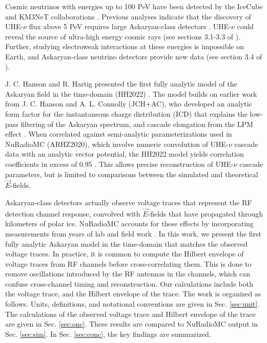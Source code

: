 \documentclass[amsmath,amssymb,aps,prd,10pt,twocolumn,showkeys]{revtex4}
\begin{document}
Cosmic neutrinos with energies up to 100 PeV have been detected by the IceCube and KM3NeT collaborations \cite{10.1126/science.1242856,aartsen2013first-bff,collaboration2016observation-03b,collaboration2018neutrino-2a0,collaboration2021detection-6fa,collaboration2022evidence-a08,collaboration2023observation-08b,collaboration2025observation-22f}. Previous analyses indicate that the discovery of UHE-$\nu$ flux above 5 PeV requires large Askaryan-class detectors \cite{10.1103/physrevd.98.062003}.  UHE-$\nu$ could reveal the source of ultra-high energy cosmic rays (see sections 3.1-3.3 of \cite{10.48550/arxiv.2008.04323}).  Further, studying electroweak interactions at these energies is impossible on Earth, and Askaryan-class neutrino detectors provide new data (see section 3.4 of \cite{10.48550/arxiv.2008.04323}).

J. C. Hanson and R. Hartig presented the first fully analytic model of the Askaryan field in the time-domain (HH2022) \cite{PhysRevD.105.123019}.  The model builds on earlier work from J. C. Hanson and A. L. Connolly (JCH+AC), who developed an analytic form factor for the instantaneous charge distribution (ICD) that explains the low-pass filtering of the Askaryan spectrum, and cascade elongation from the LPM effect \cite{10.1016/j.astropartphys.2017.03.008}.  When correlated against semi-analytic parameterizations used in NuRadioMC (ARHZ2020), which involve numeric convolution of UHE-$\nu$ cascade data with an analytic vector potential, the HH2022 model yields correlation coefficients in excess of 0.95 \cite{PhysRevD.101.083005,PhysRevD.105.123019}.  This allows precise reconstruction of UHE-$\nu$ cascade parameters, but is limited to comparisons between the simulated and theoretical $\vec{E}$-fields.

Askaryan-class detectors actually observe voltage traces that represent the RF detection channel response, convolved with $\vec{E}$-fields that have propagated through kilometers of polar ice.  NuRadioMC accounts for these effects by incorporating measurements from years of lab and field work \cite{10.1016/j.astropartphys.2014.09.002,10.3189/2015jog14j214,10.3189/2015jog15j057,saltzberg,10.1103/PhysRevD.74.043002,ask_ice,10.1140/epjc/s10052-020-7612-8,Barwick:2018497,ALLISON201963,10.1088/1748-0221/15/09/p09039,deaconu2018measurements-182,welling2024brief-b47}.  In this work, we present the first fully analytic Askaryan model in the time-domain that matches the observed voltage traces.  In practice, it is common to compute the Hilbert envelope of voltage traces from RF channels before cross-correlating them.  This is done to remove oscillations introduced by the RF antennas in the channels, which can confuse cross-channel timing and reconstruction.  Our calculations include both the voltage trace, and the Hilbert envelope of the trace.  The work is organized as follows.  Units, definitions, and notational conventions are given in Sec. \ref{sec:unit}.  The calculations of the observed voltage trace and Hilbert envelope of the trace are given in Sec. \ref{sec:onc}.  These results are compared to NuRadioMC output in Sec. \ref{sec:sim}.  In Sec. \ref{sec:conc}, the key findings are summarized.
\end{document}

